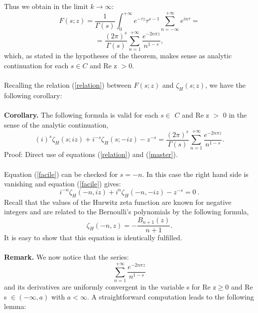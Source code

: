 \documentclass [11pt]{article}
\begin{document}
Thus we obtain in the limit $k\rightarrow\infty$:
\begin{equation}\nonumber
F(s;z)=\frac{1}{\Gamma (s)}\int ^{+\infty }_{0 }e^{-\tau z}{\tau}^{s-1}\sum _{n=-\infty }^{+\infty }e^{in\tau}=
\end{equation}
$$
=\frac{(2\pi)^{s}}{\Gamma (s)}
\sum _{n=1}^{+\infty }\frac{e^{-2n\pi z}}{n^{1-s}},
$$
which, as stated in the hypotheses of the theorem, makes sense as analytic
continuation for each $s\in C$ and Re z $>$0.\\
\\
Recalling the relation (\ref{relation}) between $F(s;z)$ and $\zeta_H(s;z)$, we have the following corollary:\\
\\
{\bf Corollary.} 
The following formula is valid for each $s\in$ $C$ and Re z $>$ 0 in the sense of the analytic continuation,\\
\begin{equation}
\label{facile}
(i)^{s}\zeta _{H}(s;iz)+i^{-s}\zeta _{H}(s;-iz)-z^{-s}=\frac{(2\pi )^{s}}{\Gamma (s)}\sum _{n=1}^{+\infty}\frac{e^{-2n\pi{z}}}{n^{1-s}}.
\end{equation}
Proof: Direct use of equations (\ref{relation}) and (\ref{master}).
\\
\\
Equation (\ref{facile}) can be checked for $s=-n$. In this case the right hand side is vanishing and
equation (\ref{facile}) gives:
\begin{equation}
{i}^{-n}\zeta_H(-n,iz) +i^{n}\zeta_H(-n,-iz) - z^{-s} = 0\:.
\end{equation}
Recall that the values of the Hurwitz zeta function are known for negative integers and are related to the
Bernoulli's polynomials by the following
 formula,
\begin{equation}
\zeta_H(-n,z)=-\frac{B_{n+1}(z)}{n+1}.
\end{equation}
It is easy to show that this equation is identically fulfilled.\\
\\
{\bf Remark.} 
We now notice that the series:\\
\begin{equation}
\sum _{n=1}^{+\infty }\frac{e^{-2n\pi z}}{n^{1-s}}
\end{equation}
and its derivatives are uniformly convergent in the variable s for $\mbox{Re z} \geq 0$ and Re s $\in (-\infty,a)$ with $a < \infty$. 
A straightforward computation leads to the following lemma:\\
\end{document}
